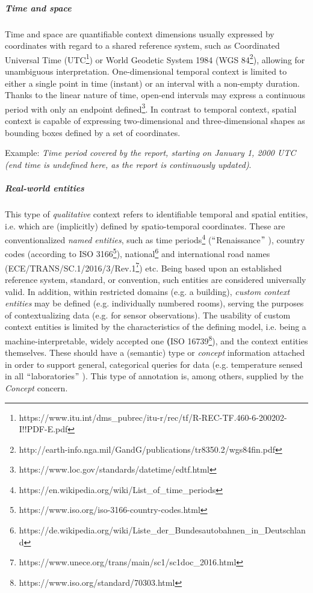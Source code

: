 \subparagraph*{Time and space}
Time and space are quantifiable context dimensions usually expressed by coordinates with regard to a shared reference system, such as Coordinated Universal Time (UTC\footnote{https://www.itu.int/dms\_pubrec/itu-r/rec/tf/R-REC-TF.460-6-200202-I!!PDF-E.pdf }) or World Geodetic System 1984 (WGS 84\footnote{http://earth-info.nga.mil/GandG/publications/tr8350.2/wgs84fin.pdf }), allowing for unambiguous interpretation. One-dimensional temporal context is limited to either a single point in time (instant) or an interval with a non-empty duration. Thanks to the linear nature of time, open-end intervals may express a continuous period with only an endpoint defined\footnote{https://www.loc.gov/standards/datetime/edtf.html }. In contrast to temporal context, spatial context is capable of expressing two-dimensional and three-dimensional shapes as bounding boxes defined by a set of coordinates. 

Example: \textit{Time period covered by the report, starting on January 1, 2000 UTC (end time is undefined here, as the report is continuously updated)}. 


\subparagraph*{Real-world entities}
This type of \textit{qualitative} context refers to identifiable temporal and spatial entities, i.e. which are (implicitly) defined by spatio-temporal coordinates. These are conventionalized \textit{named entities}, such as time periods\footnote{https://en.wikipedia.org/wiki/List\_of\_time\_periods } ($``$Renaissance$"$ ), country codes (according to ISO 3166\footnote{https://www.iso.org/iso-3166-country-codes.html }), national\footnote{https://de.wikipedia.org/wiki/Liste\_der\_Bundesautobahnen\_in\_Deutschland } and international road names (ECE/TRANS/SC.1/2016/3/Rev.1\footnote{https://www.unece.org/trans/main/sc1/sc1doc\_2016.html }) etc. Being based upon an established reference system, standard, or convention, such entities are considered universally valid. In addition, within restricted domains (e.g. a building), \textit{custom context entities} may be defined (e.g. individually numbered rooms), serving the purposes of contextualizing data (e.g. for sensor observations). The usability of custom context entities is limited by the characteristics of the defining model, i.e. being a machine-interpretable, widely accepted one \textbf{(}ISO 16739\footnote{https://www.iso.org/standard/70303.html }), and the context entities themselves. These should have a (semantic) type or \textit{concept} information attached in order to support general, categorical queries for data (e.g. temperature sensed in all $``$laboratories$"$ ). This type of annotation is, among others, supplied by the \textit{Concept }concern. 

